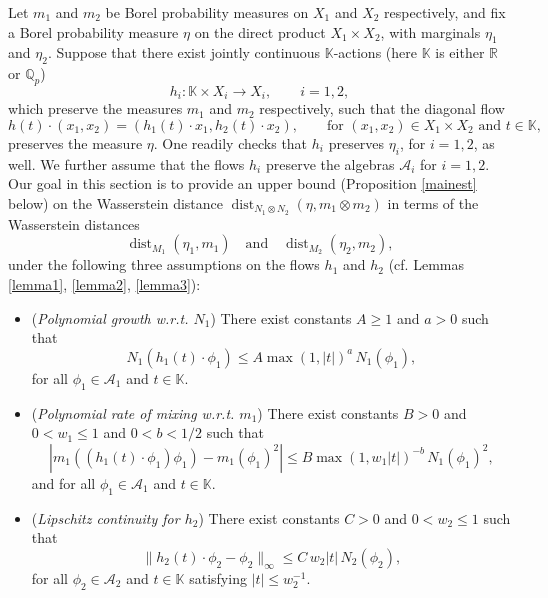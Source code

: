 \documentclass[11pt,reqno,a4paper]{amsart}
\numberwithin{equation}{section}
\newcommand{\cA}{\mathcal{A}}
\newcommand{\bK}{\mathbb{K}}
\newcommand{\bQ}{\mathbb{Q}}
\newcommand{\bR}{\mathbb{R}}
\newcommand{\ra}{\rightarrow}
\newcommand{\qand}{\quad \textrm{and} \quad}
\DeclareMathOperator{\dist}{dist}
\theoremstyle{theorem}
\theoremstyle{definition}
\begin{document}
Let $m_1$ and $m_2$ be Borel probability measures on $X_1$ and $X_2$ respectively, and fix a Borel 
probability measure $\eta$ on the direct product $X_1 \times X_2$, with marginals $\eta_1$ and $\eta_2$. 
Suppose that there exist jointly continuous $\bK$-actions (here $\bK$ is either $\bR$ or $\bQ_p$)
\[
h_i : \bK \times X_i \ra X_i, \quad\quad \textrm{$i = 1,2$},
\]
which preserve the measures $m_1$ and $m_2$ respectively, such that the {diagonal flow}
\begin{equation}
\label{defh0}
h(t) \cdot (x_1,x_2) = (h_1(t) \cdot x_1, h_2(t) \cdot x_2), 
\quad \quad
\textrm{for $(x_1,x_2) \in X_1 \times X_2$ and $t \in \bK$},
\end{equation}
preserves the measure $\eta$. One readily checks that $h_i$ preserves $\eta_i$, for $i = 1,2$, as well. We further
assume that the flows $h_i$ preserve the algebras $\cA_i$ for $i = 1,2$.\\

Our goal in this section is to provide an upper bound (Proposition \ref{mainest} below) on the Wasserstein
distance $\dist_{N_1 \otimes N_2}(\eta,m_1 \otimes m_2)$ in terms 
of the Wasserstein distances 
\[
\dist_{M_1}(\eta_1,m_1) \qand \dist_{M_2}(\eta_2,m_2), 
\]
under the following three assumptions on the flows $h_1$ and $h_2$
(cf. Lemmas \ref{lemma1}, \ref{lemma2}, \ref{lemma3}):

\begin{itemize}
\item (\textit{Polynomial growth w.r.t. $N_1$})
There exist constants $A \geq 1$ and $a > 0$ such that
\begin{equation}
\label{ass:polygrowth}
N_1(h_1(t) \cdot \phi_1) \leq A \max(1,|t|)^{a}\, N_1(\phi_1), 
\end{equation}
for all $\phi_1 \in \cA_1$ and $t\in \mathbb{K}$.

\item
(\textit{Polynomial rate of mixing w.r.t. $m_1$})
There exist constants $B > 0$ and $0 < w_1 \leq 1$ and $0 < b < 1/2$ such that
\begin{equation}
\label{ass:polmix}
| m_1((h_1(t) \cdot \phi_1) \phi_1) - m_1(\phi_1)^2 | \leq B \max(1,w_1 |t|)^{-b}\, N_1(\phi_1)^2, 
\end{equation}
and for all $\phi_1 \in \cA_1$ and $t\in\mathbb{K}$.

\item (\textit{Lipschitz continuity for $h_2$})
There exist constants $C > 0$ and $0 < w_2 \leq 1$ such that
\begin{equation}
\label{ass:Holder}
\|h_2(t) \cdot \phi_2 - \phi_2\|_\infty \leq C\, w_2 |t| \, N_2(\phi_2),
\end{equation}
for all $\phi_2 \in \cA_2$ and $t\in \mathbb{K}$ satisfying $|t|\le w_2^{-1}$.

\end{itemize}
\end{document}
